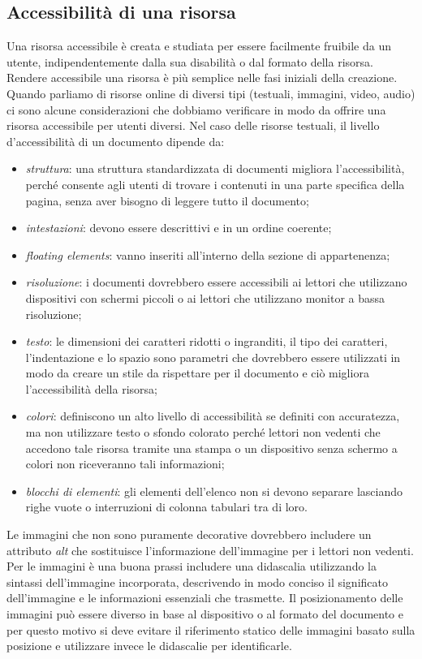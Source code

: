 \subsection{Accessibilità di una risorsa}
Una risorsa accessibile è creata e studiata per essere facilmente fruibile da un utente, indipendentemente dalla sua disabilità o dal formato della risorsa. Rendere accessibile una risorsa è più semplice nelle fasi iniziali della creazione. Quando parliamo di risorse online di diversi tipi (testuali, immagini, video, audio) ci sono alcune considerazioni che dobbiamo verificare in modo da offrire una risorsa accessibile per utenti diversi. Nel caso delle risorse testuali, il livello d'accessibilità di un documento dipende da:
\begin{itemize}
    \item \textit{struttura}: una struttura standardizzata di documenti migliora l'accessibilità, perché consente agli utenti di trovare i contenuti in una parte specifica della pagina, senza aver bisogno di leggere tutto il documento;
    \item \textit{intestazioni}: devono essere descrittivi e in un ordine coerente;
    \item \textit{floating elements}: vanno inseriti all'interno della sezione di appartenenza;
    \item \textit{risoluzione}: i documenti dovrebbero essere accessibili ai lettori che utilizzano dispositivi con schermi piccoli o ai lettori che utilizzano monitor a bassa risoluzione;
    \item \textit{testo}: le dimensioni dei caratteri ridotti o ingranditi, il tipo dei caratteri, l'indentazione e lo spazio sono parametri che dovrebbero essere utilizzati in modo da creare un stile da rispettare per il documento e ciò migliora l'accessibilità della risorsa;
    \item \textit{colori}: definiscono un alto livello di accessibilità se definiti con accuratezza, ma non utilizzare testo o sfondo colorato perché lettori non vedenti che accedono tale risorsa tramite una stampa o un dispositivo senza schermo a colori non riceveranno tali informazioni;
    \item \textit{blocchi di elementi}: gli elementi dell'elenco non si devono separare lasciando righe vuote o interruzioni di colonna tabulari tra di loro.
\end{itemize}

Le immagini che non sono puramente decorative dovrebbero includere un attributo \textit{alt} che sostituisce l'informazione dell'immagine per i lettori non vedenti. Per le immagini è una buona prassi includere una didascalia utilizzando la sintassi dell'immagine incorporata, descrivendo in modo conciso il significato dell'immagine e le informazioni essenziali che trasmette. Il posizionamento delle immagini può essere diverso in base al dispositivo o al formato del documento e per questo motivo si deve evitare il riferimento statico delle immagini basato sulla posizione e utilizzare invece le didascalie per identificarle.


